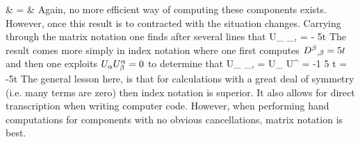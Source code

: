 \documentclass[12pt]{article}
\begin{document}
       & = & \eqp
\eea
Again, no more efficient way of computing these components exists.  However, once this
result is to contracted with  the situation changes.  Carrying
through the matrix notation one finds after several lines that
\be
  U_{\ga} _{,\gb} = - 5t \eqp
\ee
The result comes more simply in index notation where one first computes
$ {D}{{}^{\beta} {}_{,\beta} }  = 5t$ and then one exploits $U_{\alpha} U^{\alpha}_{\beta} = 0$
to determine that
\be
  U_{\ga} _{,\gb} = U_{\ga} U^{\ga} 
                                        = -1 5 t  = -5t \eqp
\ee
The general lesson here, is that for calculations with a great deal of symmetry
(i.e. many terms are zero) then index notation is superior.  It also allows
for direct transcription when writing computer code.  However, when
performing hand computations for components with no obvious cancellations, matrix
notation is best.
\end{document}
